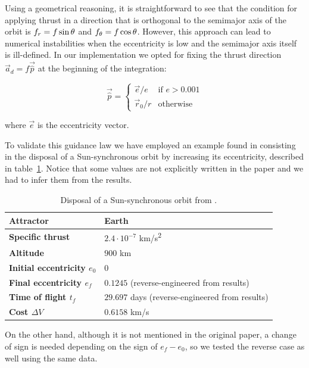 Using a geometrical reasoning, it is straightforward to see that the condition for applying thrust in a direction that is orthogonal to the semimajor axis of the orbit is $f_r = f \sin{\ensuremath{\theta}}$ and $f_{\theta} = f \cos{\ensuremath{\theta}}$. However, this approach can lead to numerical instabilities when the eccentricity is low and the semimajor axis itself is ill-defined. In our implementation we opted for fixing the thrust direction $\vec{a}_d = f \vec{\hat{p}}$ at the beginning of the integration: %

\[ \vec{\hat{p}} = \begin{cases}
\vec{e} / e   & \text{if } e > 0.001 \\
\vec{r}_0 / r & \text{otherwise}
\end{cases}
\]

where $\vec{e}$ is the eccentricity vector.

To validate this guidance law we have employed an example found in \cite{ruggiero2011low} consisting in the disposal of a Sun-synchronous orbit by increasing its eccentricity, described in table~\ref{tab:sso}. Notice that some values are not explicitly written in the paper and we had to infer them from the results.

\begin{table}
\centering
\begin{tabular}{|l|l|}
\hline
\textbf{Attractor}            & Earth \\ \hline
\textbf{Specific thrust}            & $2.4 \cdot 10^{-7}$ km/s\textsuperscript{2}      \\ \hline
\textbf{Altitude}                   & $900$ km                                   \\ \hline
\textbf{Initial eccentricity $e_0$} & $0$                                        \\ \hline
\textbf{Final eccentricity $e_f$}   & $0.1245$ (reverse-engineered from results) \\ \hline
\textbf{Time of flight $t_f$}   & $29.697$ days (reverse-engineered from results) \\ \hline
\textbf{Cost $\Delta V$}   & $0.6158$ km/s \\ \hline
\end{tabular}
\caption{Disposal of a Sun-synchronous orbit from \cite{ruggiero2011low}.}
\label{tab:sso}
\end{table}

On the other hand, although it is not mentioned in the original paper, a change of sign is needed depending on the sign of $e_f - e_0$, so we tested the reverse case as well using the same data.

